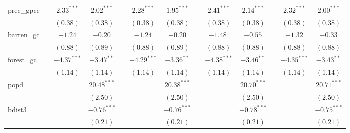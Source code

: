 \begin{sidewaystable}
\begin{center}
{\begin{tabular}{l c c c c c c c c c c c c}
prec\_gpcc          &                & $2.33^{***}$   & $2.02^{***}$   &                & $2.28^{***}$    & $1.95^{***}$     &                & $2.41^{***}$    & $2.14^{***}$   &                & $2.32^{***}$   & $2.00^{***}$   \\
                    &                & $(0.38)$       & $(0.38)$       &                & $(0.38)$        & $(0.38)$         &                & $(0.38)$        & $(0.38)$       &                & $(0.38)$       & $(0.38)$       \\
barren\_gc          &                & $-1.24$        & $-0.20$        &                & $-1.24$         & $-0.20$          &                & $-1.48^{\cdot}$ & $-0.55$        &                & $-1.32$        & $-0.33$        \\
                    &                & $(0.88)$       & $(0.89)$       &                & $(0.88)$        & $(0.89)$         &                & $(0.88)$        & $(0.88)$       &                & $(0.88)$       & $(0.88)$       \\
forest\_gc          &                & $-4.37^{***}$  & $-3.47^{**}$   &                & $-4.29^{***}$   & $-3.36^{**}$     &                & $-4.38^{***}$   & $-3.46^{**}$   &                & $-4.35^{***}$  & $-3.43^{**}$   \\
                    &                & $(1.14)$       & $(1.14)$       &                & $(1.14)$        & $(1.14)$         &                & $(1.14)$        & $(1.14)$       &                & $(1.14)$       & $(1.14)$       \\
popd                &                &                & $20.48^{***}$  &                &                 & $20.38^{***}$    &                &                 & $20.70^{***}$  &                &                & $20.71^{***}$  \\
                    &                &                & $(2.50)$       &                &                 & $(2.50)$         &                &                 & $(2.50)$       &                &                & $(2.50)$       \\
bdist3              &                &                & $-0.76^{***}$  &                &                 & $-0.76^{***}$    &                &                 & $-0.78^{***}$  &                &                & $-0.75^{***}$  \\
                    &                &                & $(0.21)$       &                &                 & $(0.21)$         &                &                 & $(0.21)$       &                &                & $(0.21)$       \\

\end{tabular}}
\end{center}
\end{sidewaystable}
